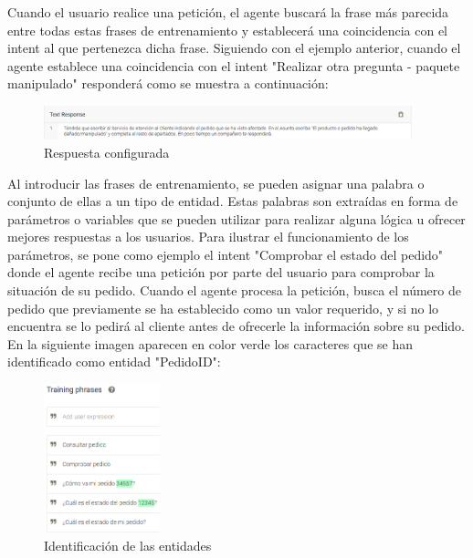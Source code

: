 Cuando el usuario realice una petición, el agente buscará la frase más parecida entre todas estas frases de entrenamiento y establecerá una coincidencia con el intent al que pertenezca dicha frase. Siguiendo con el ejemplo anterior, cuando el agente establece una coincidencia con el intent "Realizar otra pregunta - paquete manipulado" responderá como se muestra a continuación:

\begin{figure}[ht]
	\begin{center}
		\includegraphics[width = 0.95\textwidth]{Figuras/intentResponse.PNG}
	\end{center}
	\caption{\label{fig:respuesta} Respuesta configurada}
\end{figure}

Al introducir las frases de entrenamiento, se pueden asignar una palabra o conjunto de ellas a un tipo de entidad. Estas palabras son extraídas en forma de parámetros o variables que se pueden utilizar para realizar alguna lógica u ofrecer mejores respuestas a los usuarios. Para ilustrar el funcionamiento de los parámetros, se pone como ejemplo el intent "Comprobar el estado del pedido" donde el agente recibe una petición por parte del usuario para comprobar la situación de su pedido. Cuando el agente procesa la petición, busca el número de pedido que previamente se ha establecido como un valor requerido, y si no lo encuentra se lo pedirá al cliente antes de ofrecerle la información sobre su pedido. En la siguiente imagen aparecen en color verde los caracteres que se han identificado como entidad "PedidoID":

\begin{figure}[ht]
	\begin{center}
		\includegraphics[width = 0.30\textwidth]{Figuras/trainingPhrasesParameters.PNG}
	\end{center}
	\caption{\label{fig:entidades} Identificación de las entidades}
\end{figure}
\newpage

